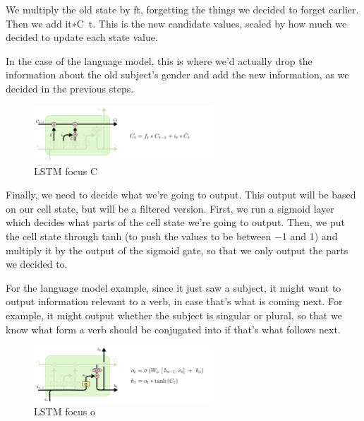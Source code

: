 {We multiply the old state by ft, forgetting the things we decided to forget earlier. Then we add it∗C~t. This is the new candidate values, scaled by how much we decided to update each state value.

In the case of the language model, this is where we’d actually drop the information about the old subject’s gender and add the new information, as we decided in the previous steps.
\renewcommand{\figurename}{Abb.}
\begin{figure}[htp]
\centering
\includegraphics[width=0.60\textwidth]{pictures/LSTM3-focus-C.png}
\caption[LSTM focus C]{LSTM focus C\protect\footnotemark}
\end{figure}
Finally, we need to decide what we’re going to output. This output will be based on our cell state, but will be a filtered version. First, we run a sigmoid layer which decides what parts of the cell state we’re going to output. Then, we put the cell state through tanh (to push the values to be between −1 and 1) and multiply it by the output of the sigmoid gate, so that we only output the parts we decided to.

For the language model example, since it just saw a subject, it might want to output information relevant to a verb, in case that’s what is coming next. For example, it might output whether the subject is singular or plural, so that we know what form a verb should be conjugated into if that’s what follows next.
\renewcommand{\figurename}{Abb.}
\begin{figure}[htp]
\centering
\includegraphics[width=0.60\textwidth]{pictures/LSTM3-focus-o.png}
\caption[LSTM focus o]{LSTM focus o\protect\footnotemark}
\end{figure}

}
